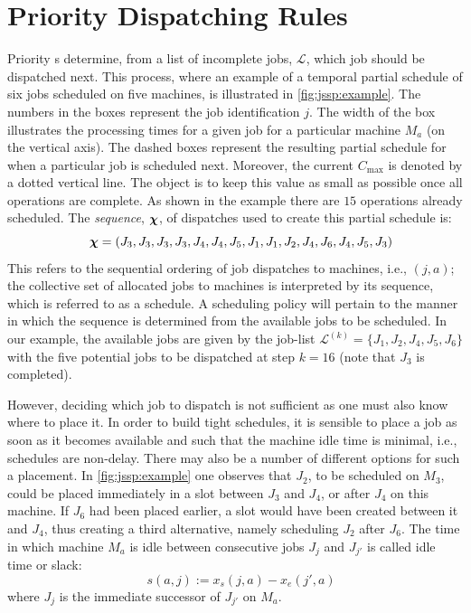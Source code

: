\documentclass[twocolumn]{svjour3}
\begin{document}
\section{Priority Dispatching Rules} \label{sec:DR}

Priority \dr s determine, from a list of incomplete jobs, 
$\mathcal{L}$, which job should be dispatched next. This process, where an 
example of 
a temporal partial schedule of six jobs scheduled on five machines, is 
illustrated in \cref{fig:jssp:example}.
The numbers in the boxes represent the job identification $j$. 
The width of the box illustrates the processing times for a given job for a 
particular machine $M_a$ (on the vertical axis). 
The dashed boxes represent the resulting partial schedule for when a particular 
job is scheduled next. 
Moreover, the current $C_{\max}$ is denoted by a dotted vertical line. 
The object is to keep this value as small as possible once all operations are 
complete. As shown in the example there are $15$ operations already scheduled. 
The \textit{sequence}, $\bm \chi$, of dispatches used to create this partial 
schedule is:
\begin{equation}\quad
\bm \chi=\left(J_3,J_3,J_3,J_3,J_4,J_4,J_5,J_1,J_1,J_2,J_4,J_6,J_4,J_5,J_3\right)
\end{equation}
This refers to the sequential ordering of job dispatches to machines, i.e., 
$(j,a)$; 
the collective set of allocated jobs to machines is interpreted by its 
sequence, which is referred to as a schedule.
A scheduling policy will pertain to the manner in which 
the sequence is determined from the available jobs to be scheduled. 
In our example, the available jobs are given by the job-list
$\mathcal{L}^{(k)}=\{J_1,J_2,J_4,J_5,J_6\}$ with the five potential jobs 
to be dispatched at step $k=16$ (note that $J_3$ is completed).

However, deciding which job to dispatch is not sufficient as one must also know 
where to place it. In order to build tight schedules, it is sensible to place a 
job as soon as it becomes available and such that the machine idle time is 
minimal, i.e., schedules are non-delay. 
There may also be a number of different options for such a placement. 
In \cref{fig:jssp:example} one observes that $J_2$, to be scheduled on $M_3$, 
could be placed immediately in a slot between $J_3$ and $J_4$, or after $J_4$ 
on this machine. 
If $J_6$ had been placed earlier, a slot would have been created between it and 
$J_4$, thus creating a third alternative, namely scheduling $J_2$ after $J_6$. 
The time in which machine $M_a$ is idle between consecutive jobs $J_j$ and 
$J_{j'}$ is called idle time or slack:
\begin{equation}\quad 
s(a,j):=x_s(j,a)-x_e(j',a) \label{eq:slack}
\end{equation}
where $J_j$ is the immediate successor of $J_{j'}$ on $M_a$. 
\end{document}
